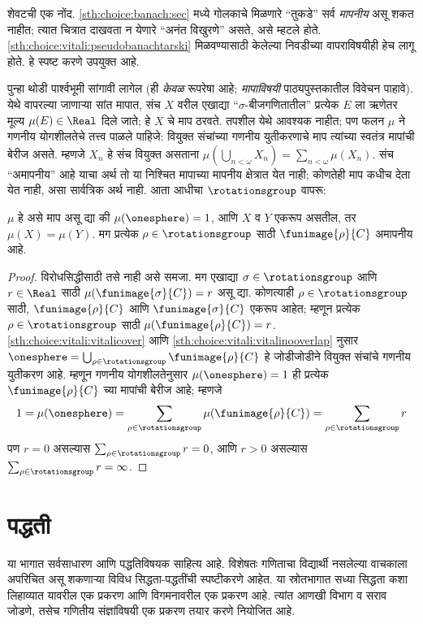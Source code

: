 शेवटची एक नोंद. \ref{sth:choice:banach:sec} मध्ये गोलकाचे मिळणारे “तुकडे” सर्व \emph{मापनीय} असू शकत नाहीत; त्यात चित्रात दाखवता न येणारे “अनंत विखुरणे” असते, असे म्हटले होते. \ref{sth:choice:vitali:pseudobanachtarski} मिळवण्यासाठी केलेल्या निवडीच्या वापराविषयीही हेच लागू होते. हे स्पष्ट करणे उपयुक्त आहे.

पुन्हा थोडी पार्श्वभूमी सांगावी लागेल (ही \emph{केवळ} रूपरेषा आहे; \emph{मापाविषयी} पाठ्यपुस्तकातील विवेचन पाहावे). येथे वापरल्या जाणाऱ्या सांत मापात, संच $X$ वरील एखाद्या “$\sigma$-बीजगणितातील” प्रत्येक $E$ ला ऋणेतर मूल्य $\mu(E) \in
\Real$ दिले जाते; हे $X$ चे माप ठरवते. तपशील येथे आवश्यक नाहीत; पण फलन $\mu$ ने गणनीय योगशीलतेचे तत्त्व पाळले पाहिजे: वियुक्त संचांच्या गणनीय युतीकरणाचे माप त्यांच्या स्वतंत्र मापांची बेरीज असते. म्हणजे $X_n$ हे संच वियुक्त असताना $\mu(\bigcup_{n < \omega} X_n) = \sum_{n < \omega}\mu(X_n)$.
संच “अमापनीय” आहे याचा अर्थ तो या निश्चित मापाच्या मापनीय क्षेत्रात येत नाही; कोणतेही माप कधीच देता येत नाही, असा सार्वत्रिक अर्थ नाही. आता आधीचा $\rotationsgroup$ वापरू:

\begin{cor}[विताली]
$\mu$ हे असे माप असू द्या की $\mu(\onesphere) = 1$, आणि $X$ व $Y$ एकरूप असतील, तर $\mu(X) = \mu(Y)$. मग प्रत्येक $\rho \in
\rotationsgroup$ साठी $\funimage{\rho}{C}$ अमापनीय आहे.
\end{cor}

\begin{proof}
विरोधसिद्धीसाठी तसे नाही असे समजा. मग एखाद्या $\sigma \in \rotationsgroup$ आणि $r \in \Real$ साठी $\mu(\funimage{\sigma}{C}) =
r$ असू द्या. कोणत्याही $\rho \in \rotationsgroup$ साठी, $\funimage{\rho}{C}$ आणि $\funimage{\sigma}{C}$ एकरूप आहेत; म्हणून प्रत्येक $\rho \in \rotationsgroup$ साठी $\mu(\funimage{\rho}{C}) = r$.
\ref{sth:choice:vitali:vitalicover} आणि \ref{sth:choice:vitali:vitalinooverlap} नुसार $\onesphere =
\bigcup_{\rho \in \rotationsgroup}\funimage{\rho}{C}$ हे जोडीजोडीने वियुक्त संचांचे गणनीय युतीकरण आहे. म्हणून गणनीय योगशीलतेनुसार $\mu(\onesphere) = 1$ ही प्रत्येक $\funimage{\rho}{C}$ च्या मापांची बेरीज आहे; म्हणजे
\[
	1 = \mu(\onesphere) = \sum_{\rho \in \rotationsgroup}\mu(\funimage{\rho}{C}) = \sum_{\rho \in \rotationsgroup}r
\]
पण $r = 0$ असल्यास $\sum_{\rho \in \rotationsgroup}r = 0$, आणि $r
> 0$ असल्यास $\sum_{\rho \in \rotationsgroup}r = \infty$.
\end{proof}



\part{पद्धती}\label{mth:part}
\begin{editorial}
  या भागात सर्वसाधारण आणि पद्धतिविषयक साहित्य आहे. विशेषतः गणिताचा विद्यार्थी नसलेल्या वाचकाला अपरिचित असू शकणाऱ्या विविध सिद्धता-पद्धतींची स्पष्टीकरणे आहेत. या स्रोतभागात सध्या सिद्धता कशा लिहाव्यात यावरील एक प्रकरण आणि विगमनावरील एक प्रकरण आहे. त्यांत आणखी विभाग व सराव जोडणे, तसेच गणितीय संज्ञांविषयी एक प्रकरण तयार करणे नियोजित आहे.
\end{editorial}
